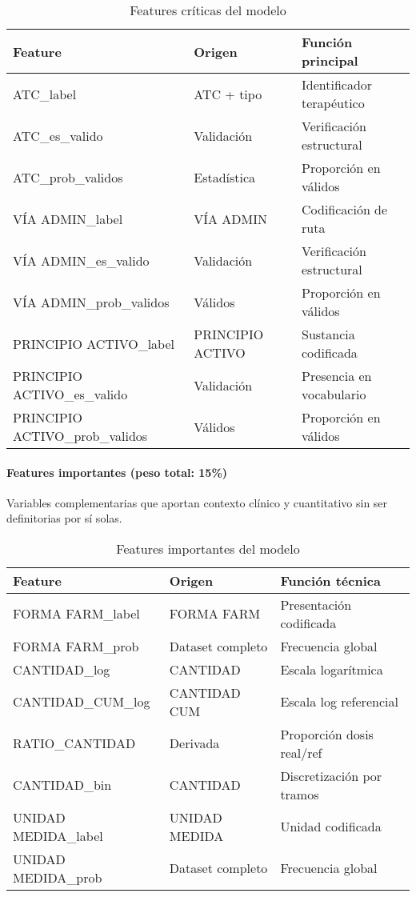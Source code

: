 \documentclass[conference]{IEEEtran}
\begin{document}
\begin{table}[h]
\caption{Features críticas del modelo}
\centering
\scriptsize
\begin{tabular}{|p{2.8cm}|p{1.5cm}|p{2.2cm}|}
\hline
\textbf{Feature} & \textbf{Origen} & \textbf{Función principal} \\
\hline
ATC\_label & ATC + tipo & Identificador terapéutico \\
\hline
ATC\_es\_valido & Validación & Verificación estructural \\
\hline
ATC\_prob\_validos & Estadística & Proporción en válidos \\
\hline
VÍA ADMIN\_label & VÍA ADMIN & Codificación de ruta \\
\hline
VÍA ADMIN\_es\_valido & Validación & Verificación estructural \\
\hline
VÍA ADMIN\_prob\_validos & Válidos & Proporción en válidos \\
\hline
PRINCIPIO ACTIVO\_label & PRINCIPIO ACTIVO & Sustancia codificada \\
\hline
PRINCIPIO ACTIVO\_es\_valido & Validación & Presencia en vocabulario \\
\hline
PRINCIPIO ACTIVO\_prob\_validos & Válidos & Proporción en válidos \\
\hline
\end{tabular}
\end{table}

\paragraph{Features importantes (peso total: 15\%)}

Variables complementarias que aportan contexto clínico y cuantitativo sin ser definitorias por sí solas.

\begin{table}[h]
\caption{Features importantes del modelo}
\centering
\scriptsize
\begin{tabular}{|p{2.8cm}|p{1.5cm}|p{2.2cm}|}
\hline
\textbf{Feature} & \textbf{Origen} & \textbf{Función técnica} \\
\hline
FORMA FARM\_label & FORMA FARM & Presentación codificada \\
\hline
FORMA FARM\_prob & Dataset completo & Frecuencia global \\
\hline
CANTIDAD\_log & CANTIDAD & Escala logarítmica \\
\hline
CANTIDAD\_CUM\_log & CANTIDAD CUM & Escala log referencial \\
\hline
RATIO\_CANTIDAD & Derivada & Proporción dosis real/ref \\
\hline
CANTIDAD\_bin & CANTIDAD & Discretización por tramos \\
\hline
UNIDAD MEDIDA\_label & UNIDAD MEDIDA & Unidad codificada \\
\hline
UNIDAD MEDIDA\_prob & Dataset completo & Frecuencia global \\
\hline
\end{tabular}
\end{table}
\end{document}
